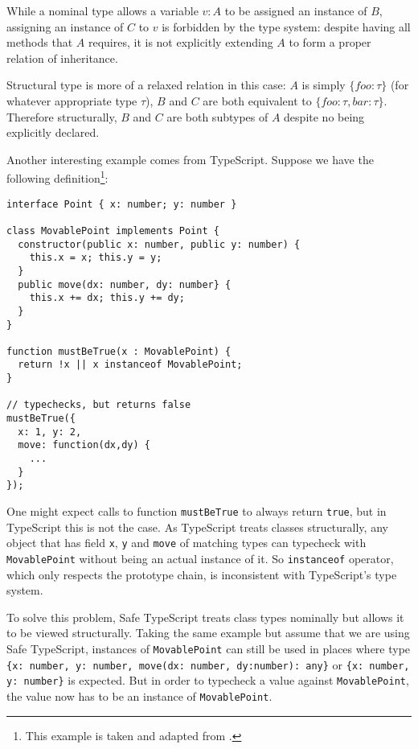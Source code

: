 While a nominal type allows a variable $v : A$ to be assigned an instance of $B$,
assigning an instance of $C$ to $v$ is forbidden by the type system: despite
having all methods that $A$ requires, it is not explicitly extending $A$ to form a proper relation of
inheritance.

Structural type is more of a relaxed relation in this case: $A$ is simply $\{foo: \tau \}$ (for whatever appropriate type $\tau$), $B$ and $C$ are both equivalent to $\{foo: \tau, bar: \tau\}$. Therefore structurally, $B$ and $C$ are both subtypes of $A$ despite no being explicitly declared.

Another interesting example comes from TypeScript.
Suppose we have the following definition\footnote{This example is taken and adapted from \cite{rastogi2015safe}.}:

\begin{verbatim}
interface Point { x: number; y: number }

class MovablePoint implements Point {
  constructor(public x: number, public y: number) {
    this.x = x; this.y = y;
  }
  public move(dx: number, dy: number} {
    this.x += dx; this.y += dy;
  }
}

function mustBeTrue(x : MovablePoint) {
  return !x || x instanceof MovablePoint;
}

// typechecks, but returns false
mustBeTrue({
  x: 1, y: 2,
  move: function(dx,dy) {
    ...
  }
}); 
\end{verbatim}

One might expect calls to function \texttt{mustBeTrue} to always return \texttt{true},
but in TypeScript this is not the case.
As TypeScript treats classes structurally, any object that has field \texttt{x}, \texttt{y} and \texttt{move}
of matching types can typecheck with \texttt{MovablePoint} without being an actual instance of it.
So \texttt{instanceof} operator, which only respects the prototype chain,
is inconsistent with TypeScript's type system.

To solve this problem, Safe TypeScript treats class types nominally but allows it to be viewed structurally.
Taking the same example but assume that we are using Safe TypeScript,
instances of \texttt{MovablePoint} can still be used in places where type 
\texttt{\{x: number, y: number, move(dx: number, dy:number): any\}}
or \texttt{\{x: number, y: number\}} is expected.
But in order to typecheck a value against \texttt{MovablePoint},
the value now has to be an instance of \texttt{MovablePoint}.


